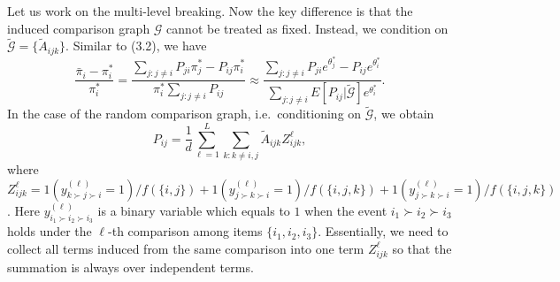 Let us work on the multi-level breaking. Now the key difference is that the induced comparison graph \(\mathcal{G}\) cannot be treated as fixed. Instead, we condition on \(\widetilde{\mathcal{G}} = \{\widetilde{A}_{ijk}\}\). Similar to (3.2), we have
\[
\frac{\bar{\pi}_{i} - \pi_{i}^{*}}{\pi_{i}^{*}} = \frac{\sum_{j:j\neq i}P_{ji}\pi_{j}^{*} - P_{ij}\pi_{i}^{*}}{\pi_{i}^{*}\sum_{j:j\neq i}P_{ij}}\approx \frac{\sum_{j:j\neq i}P_{ji}e^{\theta_{j}^{*}} - P_{ij}e^{\theta_{i}^{*}}}{\sum_{j:j\neq i}E[P_{ij}|\widetilde{\mathcal{G}}]e^{\theta_{i}^{*}}}.
\]
In the case of the random comparison graph, i.e.~conditioning on \(\widetilde{\mathcal{G}}\), we obtain
\[
P_{ij} = \frac{1}{d}\sum_{\ell = 1}^{L}\sum_{k:k\neq i,j}\widetilde{A}_{ijk}Z_{ijk}^{\ell}, \tag{3.7}
\]
where \(Z_{ijk}^{\ell} = 1(y_{k\succ j \succ i}^{(\ell)} = 1) / f(\{i,j\}) + 1(y_{j\succ k \succ i}^{(\ell)} = 1) / f(\{i,j,k\}) + 1(y_{j\succ k\succ i}^{(\ell)} = 1) / f(\{i,j,k\})\). Here \(y_{i_1\succ i_2\succ i_3}^{(\ell)}\) is a binary variable which equals to \(1\) when the event \(i_1\succ i_2\succ i_3\) holds under the \(\ell\)-th comparison among items \(\{i_1,i_2,i_3\}\). Essentially, we need to collect all terms induced from the same comparison into one term \(Z_{ijk}^{\ell}\) so that the summation is always over independent terms.

